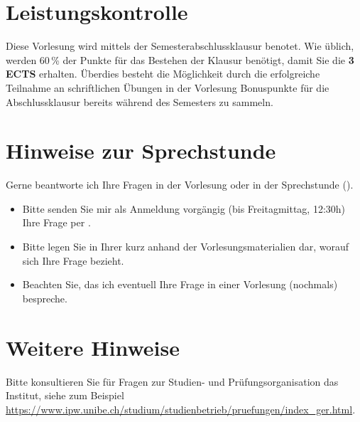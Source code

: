 \documentclass[12pt,a4paper]{article}
\begin{document}
\clearpage
\section{Leistungskontrolle}
Diese Vorlesung wird mittels der Semesterabschlussklausur benotet. Wie üblich, werden 60\,\% der Punkte für das Bestehen der Klausur benötigt, damit Sie die \textbf{3 ECTS} erhalten. Überdies besteht die Möglichkeit durch die erfolgreiche Teilnahme an schriftlichen Übungen in der Vorlesung Bonuspunkte für die Abschlussklausur bereits während des Semesters zu sammeln.



\section{Hinweise zur Sprechstunde} Gerne beantworte ich Ihre Fragen in der Vorlesung oder in der Sprechstunde (\DateTimeOfficeHours).
\begin{itemize}
    \item Bitte senden Sie mir als Anmeldung vorgängig (bis Freitagmittag, 12:30h) Ihre Frage per 
    . %
    \item Bitte legen Sie in Ihrer  kurz anhand der Vorlesungsmaterialien dar, worauf sich Ihre Frage bezieht.
    \item Beachten Sie, das ich eventuell Ihre Frage in einer Vorlesung (nochmals) bespreche. 
\end{itemize}


\section{Weitere Hinweise} Bitte konsultieren Sie für Fragen zur Studien- und Prüfungsorganisation das Institut, siehe zum Beispiel \url{https://www.ipw.unibe.ch/studium/studienbetrieb/pruefungen/index_ger.html}.


 \insert{}



\end{document}
